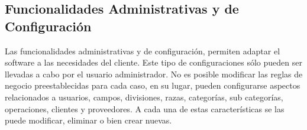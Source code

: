 \documentclass[11pt,oneside]{book}
\begin{document}
\newpage
\subsection{Funcionalidades Administrativas y de Configuración}\label{FAC}
Las funcionalidades administrativas y de configuración, permiten adaptar el software a las necesidades del cliente. Este tipo de configuraciones sólo pueden ser llevadas a cabo por el usuario administrador. No es posible modificar las reglas de negocio preestablecidas para cada caso, en su lugar, pueden configurarse aspectos relacionados a usuarios, campos, divisiones, razas, categorías, sub categorías, operaciones, clientes y proveedores. A cada una de estas características se las puede modificar, eliminar o bien crear nuevas.

\end{document}
